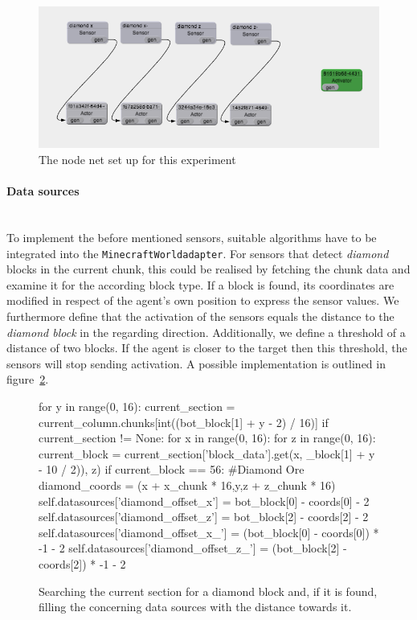 \begin{figure}[h]
  \centering
    \includegraphics[width=14cm]{graphics/nodenet_setup}
  \caption{The node net set up for this experiment}
  \label{nodenet_setup}
\end{figure}

\paragraph{Data sources}$\;$ \\

To implement the before mentioned sensors, suitable algorithms have to be integrated into the \texttt{MinecraftWorldadapter}. For sensors that detect \emph{diamond} blocks in the current chunk, this could be realised by fetching the chunk data and examine it for the according block type. If a block is found, its coordinates are modified in respect of the agent's own position to express the sensor values. We furthermore define that the activation of the sensors equals the distance to the \emph{diamond block} in the regarding direction. Additionally, we define a threshold of a distance of two blocks. If the agent is closer to the target then this threshold, the sensors will stop sending activation. A possible implementation is outlined in figure~\ref{listing_sensors}. 

		\begin{figure}[ht]
			\centering
			\begin{minipage}{17cm}
				\begin{pseudocode}
for y in range(0, 16):
 current_section = current_column.chunks[int((bot_block[1] + y -  2) / 16)]
 if current_section != None:
  for x in range(0, 16):
   for z in range(0, 16):
    current_block = current_section['block_data'].get(x, _block[1] + y - 10 / 2)), z)
    if current_block == 56: #Diamond Ore
     diamond_coords = (x + x_chunk * 16,y,z + z_chunk * 16)
     self.datasources['diamond_offset_x'] = bot_block[0] - coords[0] - 2
     self.datasources['diamond_offset_z'] = bot_block[2] - coords[2] - 2
     self.datasources['diamond_offset_x_'] = (bot_block[0] - coords[0]) * -1 - 2
     self.datasources['diamond_offset_z_'] = (bot_block[2] - coords[2]) * -1 - 2
			\end{pseudocode}
		\caption{Searching the current section for a diamond block and, if it is found, filling the concerning data sources with the distance towards it.}
		\label{listing_sensors}
	\end{minipage}
\end{figure}

